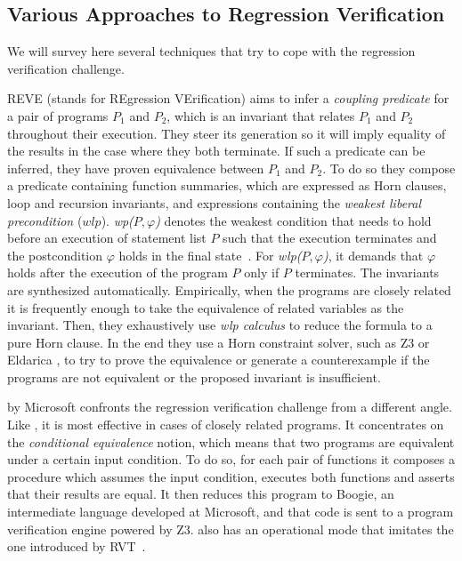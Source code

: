 \subsection{Various Approaches to Regression Verification}
We will survey here several techniques that try to cope with the regression verification challenge.

REVE (stands for REgression VErification) \cite{DBLP:conf/kbse/FelsingGKRU14} aims to infer a \emph{coupling predicate} for a pair of programs $P_1$ and $P_2$, which is an invariant that relates $P_1$ and $P_2$ throughout their execution. They steer its generation so it will imply equality of the results in the case where they both terminate. If such a predicate can be inferred, they have proven equivalence between $P_1$ and $P_2$. To do so they compose a predicate containing function summaries, which are expressed as Horn clauses, loop and recursion invariants, and expressions containing the \emph{weakest liberal precondition} ($wlp$). \emph{wp($P,\varphi$)} denotes the weakest condition that needs to hold before an execution of statement list $P$ such that the execution terminates and the postcondition $\varphi$ holds in the final state~\cite{DBLP:journals/cacm/Dijkstra75}. For \emph{wlp($P,\varphi$)}, it demands that $\varphi$ holds after the execution of the program $P$ only if $P$ terminates. The invariants are synthesized automatically. Empirically, when the programs are closely related it is frequently enough to take the equivalence of related variables as the invariant. Then, they exhaustively use \emph{wlp calculus} to reduce the formula to a pure Horn clause. In the end they use a Horn constraint solver, such as Z3 \cite{DBLP:conf/sat/HoderB12} or Eldarica \cite{DBLP:conf/cav/RummerHK13}, to try to prove the equivalence or generate a counterexample if the programs are not equivalent or the proposed invariant is insufficient.

 by Microsoft \cite{DBLP:conf/cav/LahiriHKR12} confronts the regression verification challenge from a different angle. Like , it is most effective in cases of closely related programs. It concentrates on the \emph{conditional equivalence} notion, which means that two programs are equivalent under a certain input condition. To do so, for each pair of functions it composes a procedure which assumes the input condition, executes both functions and asserts that their results are equal. It then reduces this program to Boogie, an intermediate language developed at Microsoft, and that code is sent to a program verification engine powered by Z3.  also has an operational mode that imitates the one introduced by RVT~\cite{DBLP:conf/dac/GodlinS09}.

